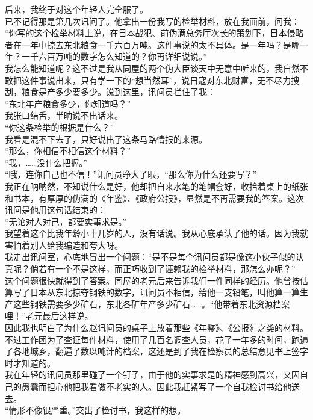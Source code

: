 后来，我终于对这个年轻人完全服了。\\

已不记得那是第几次讯问了。他拿出一份我写的检举材料，放在我面前，问我：\\

“你写的这个检举材料上说，在日本战犯、前伪满总务厅次长的策划下，日本侵略者在一年中掠去东北粮食一千六百万吨。这件事说的太不具体。是一年吗？是哪一年？一千六百万吨的数字怎么知道的？你再详细说说。”\\

我怎么能知道呢？这不过是我从同屋的两个伪大臣谈天中无意中听来的，我自然不敢把这件事说出来，只有学一下的“想当然耳”，说日寇对东北财富，无不尽力搜刮，粮食是产多少要多少。说到这里，讯问员拦住了我：\\

“东北年产粮食多少，你知道吗？”\\

我张口结舌，半晌说不出话来。\\

“你这条检举的根据是什么？”\\

我看是混不下去了，只好说出了这条马路情报的来源。\\

“那么，你相信不相信这个材料？”\\

“我，……没什么把握。”\\

“哦，连你自己也不信！”讯问员睁大了眼，“那么你为什么还要写？”\\

我正在呐呐然，不知说什么是好，他却把自来水笔的笔帽套好，收拾着桌上的纸张和书本，有厚厚的伪满的《年鉴》、《政府公报》，显然是不再需要我的答案。这次讯问是他用这句话结束的：\\

“无论对人对己，都要实事求是。”\\

我望着这个比我年龄小十几岁的人，没有话说。我从心底承认了他的话。因为我就害怕着别人给我编造和夸大呀。\\

我走出讯问室，心底地冒出一个问题：“是不是每个讯问员都是像这小伙子似的认真呢？倘若有一个不是这样，而正巧收到了诬赖我的检举材料，那怎么办呢？”\\

这个问题很快就得到了答案。同屋的老元后来告诉我们一件同样的经历。他曾按估算写了日本从东北掠夺钢铁的数字，讯问员不相信，给他一支铅笔，叫他算一算生产这些钢铁需要多少矿石，东北各矿年产多少矿石……。“他带着东北资源档案哩！”老元最后这样说。\\

因此我也明白了为什么赵讯问员的桌子上放着那些《年鉴》、《公报》之类的材料。不过工作团为了查证每件材料，使用了几百名调查人员，花了一年多的时间，跑遍了各地城乡，翻遍了数以吨计的档案，这还是到了我在检察员的总结意见书上签字时才知道的。\\

我在年轻的讯问员那里碰了一个钉子，由于他的实事求是的精神感到高兴，又因自己的愚蠢而担心他把我看做不老实的人。因此我赶紧写了一个自我检讨书给他送去。\\

“情形不像很严重。”交出了检讨书，我这样的想。
